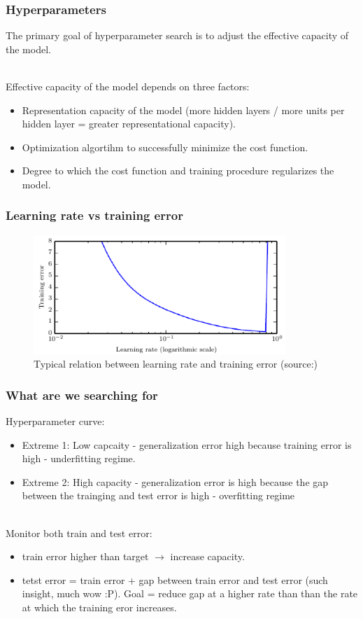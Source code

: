 \documentclass{beamer}
\begin{document}
\begin{frame}
    \frametitle{Hyperparameters}
    The primary goal of hyperparameter search is to adjust the effective capacity
    of the model.

~\\ Effective capacity of the model depends on three factors:
\begin{itemize}
    \item Representation capacity of the model (more hidden layers / more units per
        hidden layer = greater representational capacity).
    \item Optimization algortihm to successfully minimize the cost function.
    \item Degree to which the cost function and training procedure regularizes the
        model.
\end{itemize}
\end{frame}

\begin{frame}
    \frametitle{Learning rate vs training error}
    \begin{figure}
        \includegraphics[width=0.85\textwidth]{learn_rate_vs_train_error}
        \caption{Typical relation between learning rate and training error
        (source:\cite{goodfellow-et-al-2016})}
        \centering
    \end{figure}
\end{frame}

\begin{frame}
    \frametitle{What are we searching for}
    Hyperparameter curve:
    \begin{itemize}
        \item Extreme 1: Low capcaity - generalization error high
            because training error is high - underfitting regime.
        \item Extreme 2: High capacity - generalization error is high because
            the gap between the trainging and test error is high - overfitting
            regime
    \end{itemize}

    ~\\ Monitor both train and test error:
    \begin{itemize}
        \item train error higher than target $ \rightarrow $ increase capacity.
        \item tetst error = train error + gap between train error and test error
            (such insight, much wow :P). Goal = reduce gap at a higher rate than
            than the rate at which the training eror increases.
    \end{itemize}
\end{frame}
\end{document}

